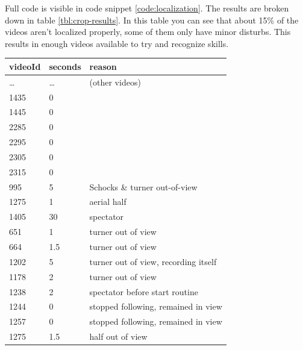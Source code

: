 Full code is visible in code snippet \ref{code:localization}. The results are broken down in table \ref{tbl:crop-results}. In this table you can see that about 15\% of the videos aren't localized properly, some of them only have minor disturbs. This results in enough videos available to try and recognize skills.


\begin{table}[h!]
    \begin{tabular}{|l|l|l|}
        \hline
        \textbf{videoId} & \textbf{seconds} & \textbf{reason} \\
        \hline
        \dots & \cellcolor{green!25} \dots & (other videos) \\ \hline
        1435 &	\cellcolor{green!25} 0 &	 \\ \hline
        1445 &	\cellcolor{green!25} 0 &	 \\ \hline
        2285 &	\cellcolor{green!25} 0 &	 \\ \hline
        2295 &	\cellcolor{green!25} 0 &	 \\ \hline
        2305 &	\cellcolor{green!25} 0 &	 \\ \hline
        2315 &	\cellcolor{green!25} 0 &	 \\ \hline
        995  &	\cellcolor{yellow!25} 5 &	Schocks \& turner out-of-view \\ \hline
        1275 &	\cellcolor{yellow!25} 1 &	aerial half \\ \hline
        1405 &	\cellcolor{orange!25} 30 &	spectator \\ \hline
        651  &	\cellcolor{yellow!25} 1    &	turner out of view \\ \hline
        664  &	\cellcolor{yellow!25} 1.5  &	turner out of view \\ \hline
        1202 &	\cellcolor{yellow!25} 5    &	turner out of view, recording itself \\ \hline
        1178 &	\cellcolor{yellow!25} 2    &	turner out of view \\ \hline
        1238 &	\cellcolor{yellow!25} 2    &	spectator before start routine \\ \hline
        1244 &	\cellcolor{yellow!25} 0    &	stopped following, remained in view \\ \hline
        1257 &	\cellcolor{yellow!25} 0    &	stopped following, remained in view \\ \hline
        1275 &	\cellcolor{yellow!25} 1.5  &	half out of view \\ \hline

\end{tabular}
\end{table}
